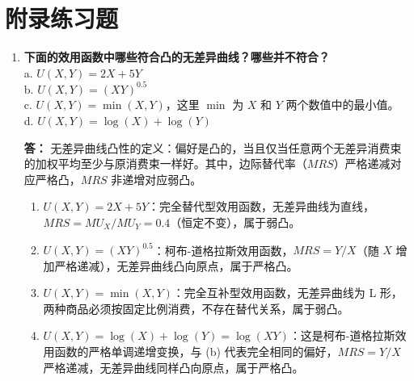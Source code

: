 	\newpage
	\section{附录练习题}
	\begin{enumerate}[label=\textbf{\arabic*.}, leftmargin=*]
		\item \textbf{下面的效用函数中哪些符合凸的无差异曲线？哪些并不符合？}\\
			a. \( U(X,Y) = 2X + 5Y \)\\
			b. \( U(X,Y) = (XY)^{0.5} \)\\
			c. \( U(X,Y) = \min(X,Y) \)，这里 $\min$ 为 $X$ 和 $Y$ 两个数值中的最小值。\\
			d. \( U(X,Y) = \log(X) + \log(Y) \)
		
		\textbf{答：}
		无差异曲线凸性的定义：偏好是凸的，当且仅当任意两个无差异消费束的加权平均至少与原消费束一样好。其中，边际替代率（$MRS$）严格递减对应严格凸，$MRS$ 非递增对应弱凸。
		
		\begin{enumerate}[label=\textbf{\alph*.}, leftmargin=2em]
			\item $U(X,Y) = 2X + 5Y$：完全替代型效用函数，无差异曲线为直线，$MRS=MU_X/MU_Y=0.4$（恒定不变），属于弱凸。
			\item $U(X,Y) = (XY)^{0.5}$：柯布-道格拉斯效用函数，$MRS=Y/X$（随 $X$ 增加严格递减），无差异曲线凸向原点，属于严格凸。
			\item $U(X,Y) = \min(X,Y)$：完全互补型效用函数，无差异曲线为 L 形，两种商品必须按固定比例消费，不存在替代关系，属于弱凸。
			\item $U(X,Y) = \log(X) + \log(Y) = \log(XY)$：这是柯布-道格拉斯效用函数的严格单调递增变换，与 (b) 代表完全相同的偏好，$MRS=Y/X$ 严格递减，无差异曲线同样凸向原点，属于严格凸。
		\end{enumerate}
		

\end{enumerate}
